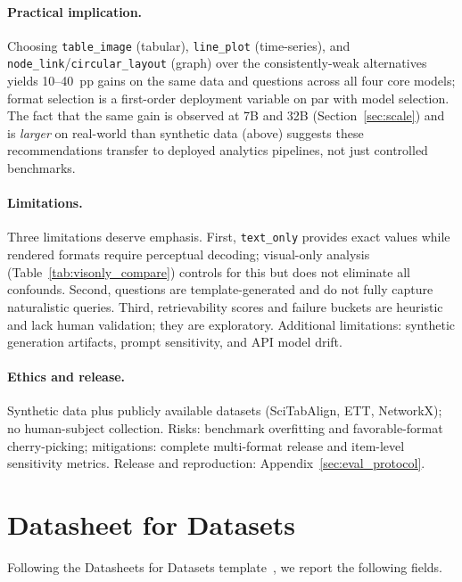 \documentclass{article}
\begin{document}
\paragraph{Practical implication.} Choosing \texttt{table\_image} (tabular), \texttt{line\_plot} (time-series), and \texttt{node\_link}/\texttt{circular\_layout} (graph) over the consistently-weak alternatives yields 10--40~pp gains on the same data and questions across all four core models; format selection is a first-order deployment variable on par with model selection. The fact that the same gain is observed at 7B and 32B (Section~\ref{sec:scale}) and is \emph{larger} on real-world than synthetic data (above) suggests these recommendations transfer to deployed analytics pipelines, not just controlled benchmarks.

\paragraph{Limitations.} Three limitations deserve emphasis. First, \texttt{text\_only} provides exact values while rendered formats require perceptual decoding; visual-only analysis (Table~\ref{tab:visonly_compare}) controls for this but does not eliminate all confounds. Second, questions are template-generated and do not fully capture naturalistic queries. Third, retrievability scores and failure buckets are heuristic and lack human validation; they are exploratory. Additional limitations: synthetic generation artifacts, prompt sensitivity, and API model drift.

\paragraph{Ethics and release.} Synthetic data plus publicly available datasets (SciTabAlign, ETT, NetworkX); no human-subject collection. Risks: benchmark overfitting and favorable-format cherry-picking; mitigations: complete multi-format release and item-level sensitivity metrics. Release and reproduction: Appendix~\ref{sec:eval_protocol}.





\appendix

\section{Datasheet for Datasets}
Following the Datasheets for Datasets template~\citep{datasheets2021}, we report the following fields.
\end{document}
